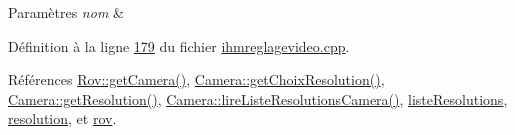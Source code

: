 \begin{DoxyParams}{Paramètres}
{\em nom} & \\
\hline
\end{DoxyParams}


Définition à la ligne \hyperlink{ihmreglagevideo_8cpp_source_l00179}{179} du fichier \hyperlink{ihmreglagevideo_8cpp_source}{ihmreglagevideo.\+cpp}.



Références \hyperlink{rov_8cpp_source_l00144}{Rov\+::get\+Camera()}, \hyperlink{camera_8cpp_source_l00128}{Camera\+::get\+Choix\+Resolution()}, \hyperlink{camera_8cpp_source_l00121}{Camera\+::get\+Resolution()}, \hyperlink{camera_8cpp_source_l00304}{Camera\+::lire\+Liste\+Resolutions\+Camera()}, \hyperlink{ihmreglagevideo_8h_source_l00040}{liste\+Resolutions}, \hyperlink{ihmreglagevideo_8h_source_l00039}{resolution}, et \hyperlink{ihmreglagevideo_8h_source_l00027}{rov}.


